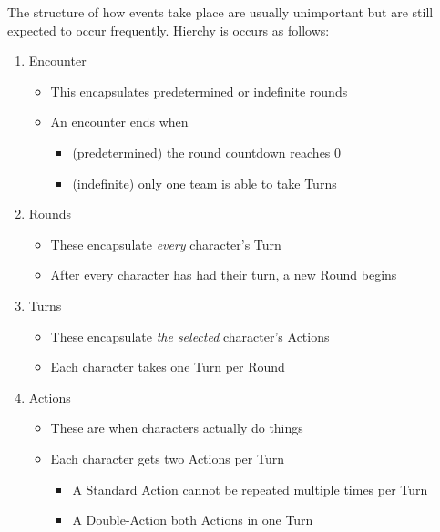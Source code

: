 The structure of how events take place are usually unimportant but
are still expected to occur frequently. Hierchy is occurs as follows:
\begin{enumerate}
\item Encounter
\begin{itemize}
\item This encapsulates predetermined or indefinite rounds
\item An encounter ends when 
\begin{itemize}
\item (predetermined) the round countdown reaches 0
\item (indefinite) only one team is able to take Turns
\end{itemize}
\end{itemize}
\item Rounds
\begin{itemize}
\item These encapsulate \emph{every} character's Turn
\item After every character has had their turn, a new Round begins
\end{itemize}
\item Turns
\begin{itemize}
\item These encapsulate \emph{the selected} character's Actions
\item Each character takes one Turn per Round
\end{itemize}
\item Actions
\begin{itemize}
\item These are when characters actually do things
\item Each character gets two Actions per Turn
\begin{itemize}
\item A Standard Action cannot be repeated multiple
times per Turn
\item A Double-Action both Actions in one Turn
\end{itemize}
\end{itemize}
\end{enumerate}

